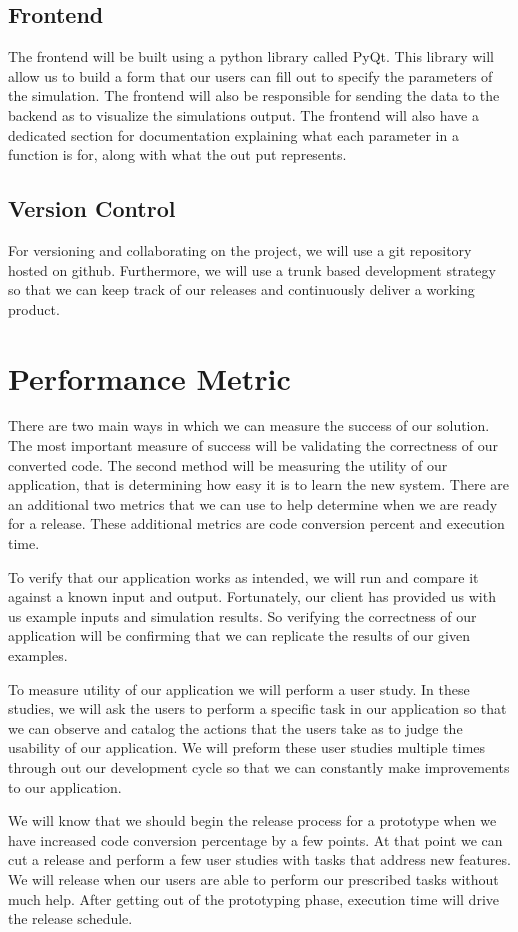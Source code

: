 \documentclass[10pt, draftclsnofoot, onecolumn]{IEEEtran}
\begin{document}
\subsection{Frontend}

The frontend will be built using a python library called PyQt. This library will allow us to build a form that our users can fill out to specify the parameters of the simulation. The frontend will also be responsible for sending the data to the backend as to visualize the simulations output. The frontend will also have a dedicated section for documentation explaining what each parameter in a function is for, along with what the out put represents.

\subsection{Version Control}

For versioning and collaborating on the project, we will use a git repository hosted on github. Furthermore, we will use a trunk based development strategy so that we can keep track of our releases and continuously deliver a working product. 

\section{Performance Metric}

There are two main ways in which we can measure the success of our solution. The most important measure of success will be validating the correctness of our converted code. The second method will be measuring the utility of our application, that is determining how easy it is to learn the new system. There are an additional two metrics that we can use to help determine when we are ready for a release. These additional metrics are code conversion percent and execution time. 

To verify that our application works as intended, we will run and compare it against a known input and output. Fortunately, our client has provided us with us example inputs and simulation results. So verifying the correctness of our application will be confirming that we can replicate the results of our given examples.

To measure utility of our application we will perform a user study. In these studies, we will ask the users to perform a specific task in our application so that we can observe and catalog the actions that the users take as to judge the usability of our application. We will preform these user studies multiple times through out our development cycle so that we can constantly make improvements to our application.

We will know that we should begin the release process for a prototype when we have increased code conversion percentage by a few points. At that point we can cut a release and perform a few user studies with tasks that address new features. We will release when our users are able to perform our prescribed tasks without much help. After getting out of the prototyping phase, execution time will drive the release schedule.  
\end{document}
